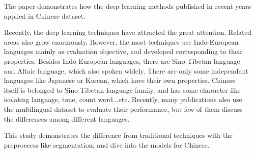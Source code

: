 \begin{abstractEN}

The paper demonstrates how the deep learning methods published in recent years applied in Chinese dataset.

Recently, the deep learning techniques have attracted the great attention. Related areas also grow enormously. 
However, the most techniques use Indo-European languages mainly as evaluation objective, and developed corresponding to their properties.  
Besides Indo-European languages, there are Sino-Tibetan language and Altaic language, which also spoken widely. 
There are only some independant languages like Japanese or Korean, which have their own properties.
Chinese itself is belonged to Sino-Tibetan language family, and has some character like isolating language, tone, count word...etc.
Recently, many publications also use the multilingual dataset to evaluate their performance, but few of them discuss the differences among different languages. 

This study demonstrates the difference from traditional techniques with the preproccess like segmentation, and dive into the models for Chinese. 

\end{abstractEN}

